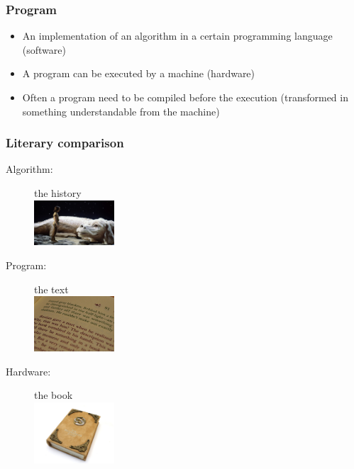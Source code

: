 \begin{frame}
  \frametitle{Program}
  \begin{itemize}
  \item An implementation of an \alert{algorithm} in a certain
    \alert{programming language} (software)
    \pause
  \item A program can be \alert{executed} by a \alert{machine}
    (hardware)
    \pause
  \item Often a program need to be \alert{compiled} before the
    execution (\alert{transformed} in something understandable from the
    machine)
  \end{itemize}
\end{frame}

\begin{frame}
  \frametitle{Literary comparison}
  \begin{description}
  \item[Algorithm:] the history \\\includegraphics[width=3cm]{img/neverEndingStory1.jpeg}
  \item[Program:] the text\\\includegraphics[width=3cm]{img/neverEndingStory2.jpeg}
  \item[Hardware:] the book\\\includegraphics[width=3cm]{img/neverEndingStory3.jpeg}
  \end{description}
\end{frame}

